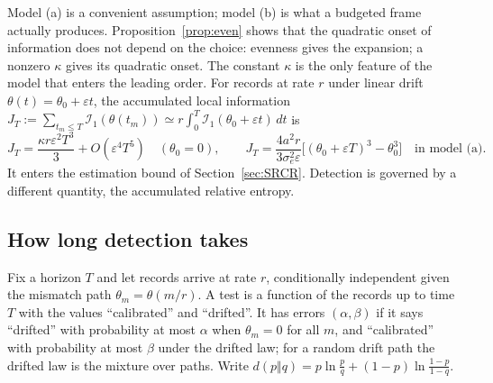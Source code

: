 \documentclass[12pt]{article}
\theoremstyle{definition}
\begin{document}
Model (a) is a convenient assumption; model (b) is what a budgeted frame actually produces. Proposition~\ref{prop:even} shows that the quadratic onset of information does not depend on the choice: evenness gives the expansion; a nonzero $\kappa$ gives its quadratic onset. The constant $\kappa$ is the only feature of the model that enters the leading order. For records at rate $r$ under linear drift $\theta(t)=\theta_0+\varepsilon t$, the accumulated local information $J_T:=\sum_{t_m\le T}\mathcal I_1(\theta(t_m))\simeq r\int_0^T\mathcal I_1(\theta_0+\varepsilon t)\,dt$ is
\begin{equation}
\label{eq:accumulated_fisher}
J_T=\frac{\kappa r\varepsilon^2T^3}{3}+O(\varepsilon^4T^5)\quad(\theta_0=0),\qquad
J_T=\frac{4a^2r}{3\sigma_e^2\varepsilon}\bigl[(\theta_0+\varepsilon T)^3-\theta_0^3\bigr]\quad\text{in model (a)}.
\end{equation}
It enters the estimation bound of Section~\ref{sec:SRCR}. Detection is governed by a different quantity, the accumulated relative entropy.

\subsection{How long detection takes}
\label{subsec:detection_time}

Fix a horizon $T$ and let records arrive at rate $r$, conditionally independent given the mismatch path $\theta_m=\theta(m/r)$. A test is a function of the records up to time $T$ with the values ``calibrated'' and ``drifted''. It has errors $(\alpha,\beta)$ if it says ``drifted'' with probability at most $\alpha$ when $\theta_m=0$ for all $m$, and ``calibrated'' with probability at most $\beta$ under the drifted law; for a random drift path the drifted law is the mixture over paths. Write $d(p\Vert q)=p\ln\frac pq+(1-p)\ln\frac{1-p}{1-q}$.
\end{document}
